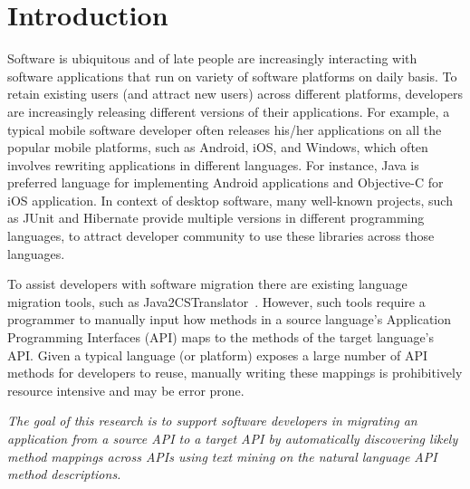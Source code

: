 \section{Introduction}
\label{sec:introduction}


Software is ubiquitous and of late people are increasingly interacting
with software applications
that run on variety of software platforms on daily basis.
To retain existing users (and attract new users) across different platforms,
developers are increasingly releasing different versions of their applications.
For example, a typical mobile software developer often releases his/her applications
on all the popular mobile platforms, such as Android, iOS, and Windows,
which often involves rewriting applications in different languages.
For instance, Java is preferred language for implementing Android applications
and Objective-C for iOS application.
In context of desktop software, many well-known projects, such as JUnit and
Hibernate provide multiple versions in different programming languages,
to attract developer community to use these
libraries across those languages.


To assist developers with software migration
there are existing language migration tools, such as Java2CSTranslator~\cite{java2cstranslator}.
However, such tools require a programmer to manually input
how methods in a source language's Application Programming Interfaces (API) maps to the methods of the target language's API. 
Given a typical language (or platform) exposes a large number of API methods for developers to reuse, manually writing these mappings is prohibitively resource intensive and may be error prone.


\textit{The goal of this research is to support software developers 
in migrating an application from a source API to a target API
by automatically discovering likely method mappings across APIs using text mining
on the natural language API method descriptions.}


